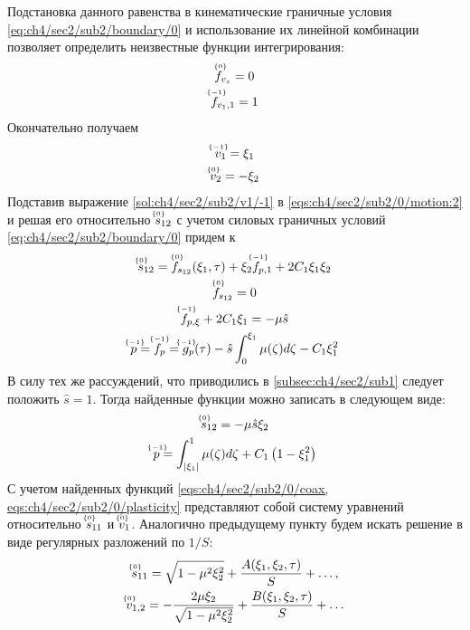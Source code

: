 Подстановка данного равенства в кинематические граничные условия \cref{eq:ch4/sec2/sub2/boundary/0} и использование их линейной комбинации позволяет определить неизвестные функции интегрирования:
\begin{gather*}
  \uindex{f}{0}_{v_{z}} = 0
  \\
  \uindex{f}{-1}_{v_{1},1} = 1
\end{gather*}
Окончательно получаем
\begin{gather}
  \label{sol:ch4/sec2/sub2/v1/-1}
  \uindex{v}{-1}_{1} = \xi_1
  \\
  \label{sol:ch4/sec2/sub2/v2/0}
  \uindex{v}{0}_{2} =  -\xi_2
\end{gather}
Подставив выражение \cref{sol:ch4/sec2/sub2/v1/-1} в \cref{eqs:ch4/sec2/sub2/0/motion:2} и решая его относительно $\uindex{s}{0}_{12}$ с учетом силовых граничных условий \cref{eq:ch4/sec2/sub2/boundary/0} придем к
\begin{gather*}
  \uindex{s}{0}_{12} = \uindex{f}{0}_{s_{12}}(\xi_1, \tau) + \xi_2  \uindex{f}{-1}_{p,1} + 2 C_1 \xi_1 \xi_2
  \\
  \uindex{f}{0}_{s_{12}} = 0
  \\
  \uindex{f}{-1}_{p,\xi} + 2 C_1 \xi_1 = -\mu \hat{s}
  \\
  \uindex{p}{-1}=\uindex{f}{-1}_{p} =\uindex{g}{-1}_{p}(\tau) -\hat{s}\int_0^{\xi_1}{\mu(\zeta)d\zeta} - C_1 \xi_1^2
\end{gather*}
В силу тех же рассуждений, что приводились в \ref{subsec:ch4/sec2/sub1} следует положить $\hat{s} = 1$. Тогда найденные функции можно записать в следующем виде:
\begin{gather}
  \label{sol:ch4/sec2/sub2/s12/0}
  \uindex{s}{0}_{12} = -\mu \hat{s} \xi_2
  \\
  \label{sol:ch4/sec2/sub2/p/-1}
  \uindex{p}{-1} = \int_{\vert\xi_1\vert}^1{\mu(\zeta)d\zeta} + C_1 \left(1-\xi_1^2\right)
\end{gather}
С учетом найденных функций \cref{eqs:ch4/sec2/sub2/0/coax, eqs:ch4/sec2/sub2/0/plasticity} представляют собой систему уравнений относительно $\uindex{s}{0}_{11}$ и $\uindex{v}{0}_{1}$.
Аналогично предыдущему пункту будем искать решение в виде регулярных разложений по $1/S$:
\begin{gather}
  \uindex{s}{0}_{11} = \sqrt{1-\mu^2\xi_2^2} + \frac{A(\xi_1,\xi_2,\tau)}{S} + \ldots, \\
  \uindex{v}{0}_{1,2} = -\frac{2\mu \xi_2}{\sqrt{1-\mu^2\xi_2^2}} + \frac{B(\xi_1,\xi_2,\tau)}{S} + \ldots
\end{gather}
